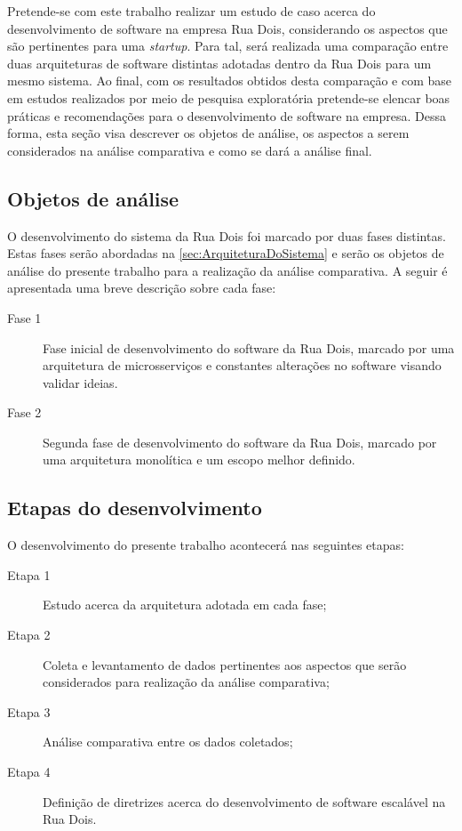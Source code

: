Pretende-se com este trabalho realizar um estudo de caso acerca do desenvolvimento
de software na empresa Rua Dois, considerando os aspectos que são pertinentes para
uma \textit{startup}. Para tal, será realizada uma comparação entre duas arquiteturas
de software distintas adotadas dentro da Rua Dois para um mesmo sistema. Ao final,
com os resultados obtidos desta comparação e com base em estudos realizados por meio
de pesquisa exploratória pretende-se elencar boas práticas e recomendações para o
desenvolvimento de software na empresa. Dessa forma, esta seção visa descrever
os objetos de análise, os aspectos a serem considerados na análise comparativa e
como se dará a análise final.

\subsection{Objetos de análise}

O desenvolvimento do sistema da Rua Dois foi marcado por duas fases distintas.
Estas fases serão abordadas na \autoref{sec:ArquiteturaDoSistema} e serão
os objetos de análise do presente trabalho para a realização da análise
comparativa. A seguir é apresentada uma breve descrição sobre cada fase:

    \begin{description}
        \item [Fase 1] Fase inicial de desenvolvimento do software da Rua Dois,
        marcado por uma arquitetura de microsserviços e constantes alterações
        no software visando validar ideias.
        \item [Fase 2] Segunda fase de desenvolvimento do software da Rua Dois,
        marcado por uma arquitetura monolítica e um escopo melhor definido.
    \end{description}

\subsection{Etapas do desenvolvimento}

O desenvolvimento do presente trabalho acontecerá nas seguintes etapas:

    \begin{description}
        \item[Etapa 1] Estudo acerca da arquitetura adotada em cada fase;
        \item[Etapa 2] Coleta e levantamento de dados pertinentes aos aspectos que serão
        considerados para realização da análise comparativa;
        \item[Etapa 3] Análise comparativa entre os dados coletados;
        \item[Etapa 4] Definição de diretrizes acerca do desenvolvimento de software
        escalável na Rua Dois.
    \end{description}

